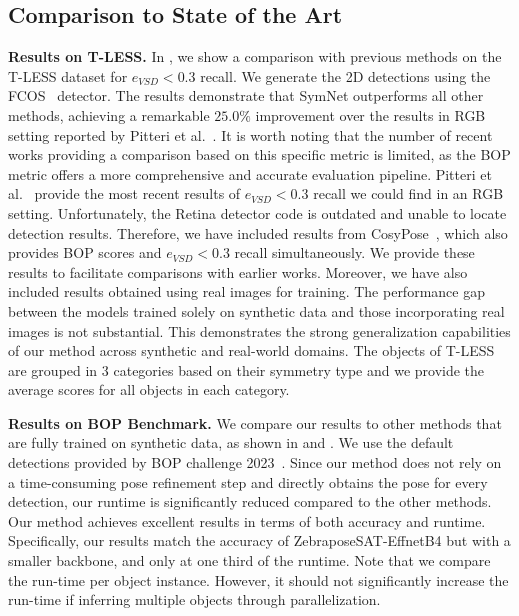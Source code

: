 \subsection{Comparison to State of the Art}


\textbf{Results on T-LESS.} In , we show a comparison with previous methods on the T-LESS dataset for $e_{VSD}<0.3$ recall. We generate the 2D detections using the FCOS~\cite{fcos} detector. The results demonstrate that SymNet outperforms all other methods, achieving a remarkable $25.0\%$ improvement over the results in RGB setting reported by Pitteri et al.~\cite{pitteri2019object}. It is worth noting that the number of recent works providing a comparison based on this specific metric is limited, as the BOP metric offers a more comprehensive and accurate evaluation pipeline. Pitteri et al.~\cite{pitteri2019object} provide the most recent results of $e_{VSD}<0.3$ recall we could find in an RGB setting. Unfortunately, the Retina detector code is outdated and unable to locate detection results. Therefore, we have included results from CosyPose~\cite{labbe2020cosypose}, which also provides BOP scores and $e_{VSD}<0.3$ recall simultaneously. We provide these results to facilitate comparisons with earlier works. Moreover, we have also included results obtained using real images for training. The performance gap between the models trained solely on synthetic data and those incorporating real images is not substantial. This demonstrates the strong generalization capabilities of our method across synthetic and real-world domains. The objects of T-LESS are grouped in 3 categories based on their symmetry type and we provide the average scores for all objects in each category.


\textbf{Results on BOP Benchmark.} We compare our results to other methods that are fully trained on synthetic data, as shown in  and . We use the default detections provided by BOP challenge 2023~\cite{hodan2024bop}. Since our method does not rely on a time-consuming pose refinement step and directly obtains the pose for every detection, our runtime is significantly reduced compared to the other methods. Our method achieves excellent results in terms of both accuracy and runtime. Specifically, our results match the accuracy of ZebraposeSAT-EffnetB4 but with a smaller backbone, and only at one third of the runtime. Note that we compare the run-time per object instance. However, it should not significantly increase the run-time if inferring multiple objects through parallelization.

